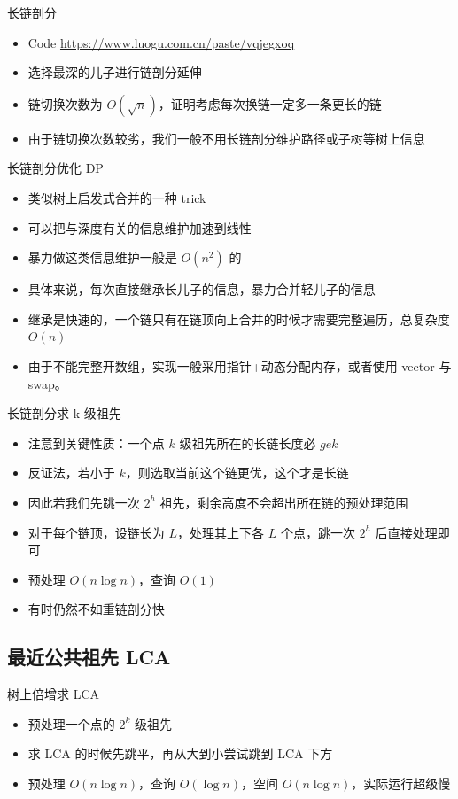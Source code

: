 ﻿\documentclass[aspectratio=169]{ctexbeamer}
\begin{document}
\begin{frame}{长链剖分}
    \begin{itemize}
        \item Code \url{https://www.luogu.com.cn/paste/vqjegxoq}
        \item 选择最深的儿子进行链剖分延伸
        \item 链切换次数为 $O(\sqrt{n})$，证明考虑每次换链一定多一条更长的链
        \item 由于链切换次数较劣，我们一般不用长链剖分维护路径或子树等树上信息
    \end{itemize}
\end{frame}

\begin{frame}{长链剖分优化 DP}
    \begin{itemize}
        \item 类似树上启发式合并的一种 trick
        \item 可以把与深度有关的信息维护加速到线性
        \item 暴力做这类信息维护一般是 $O(n^2)$ 的
        \item 具体来说，每次直接继承长儿子的信息，暴力合并轻儿子的信息
        \item 继承是快速的，一个链只有在链顶向上合并的时候才需要完整遍历，总复杂度 $O(n)$
        \item 由于不能完整开数组，实现一般采用指针+动态分配内存，或者使用 vector 与 swap。
    \end{itemize}
\end{frame}

\begin{frame}{长链剖分求 k 级祖先}
    \begin{itemize}
        \item 注意到关键性质：一个点 $k$ 级祖先所在的长链长度必 $ge k$
        \item 反证法，若小于 $k$，则选取当前这个链更优，这个才是长链
        \item 因此若我们先跳一次 $2^h$ 祖先，剩余高度不会超出所在链的预处理范围
        \item 对于每个链顶，设链长为 $L$，处理其上下各 $L$ 个点，跳一次 $2^h$ 后直接处理即可
        \item 预处理 $O(n\log n)$，查询 $O(1)$
        \item 有时仍然不如重链剖分快
    \end{itemize}
\end{frame}

\subsection{最近公共祖先 LCA}
\begin{frame}{树上倍增求 LCA}
    \begin{itemize}
        \item 预处理一个点的 $2^k$ 级祖先
        \item 求 LCA 的时候先跳平，再从大到小尝试跳到 LCA 下方
        \item 预处理 $O(n\log n)$，查询 $O(\log n)$，空间 $O(n\log n)$，实际运行超级慢
    \end{itemize}
\end{frame}
\end{document}

